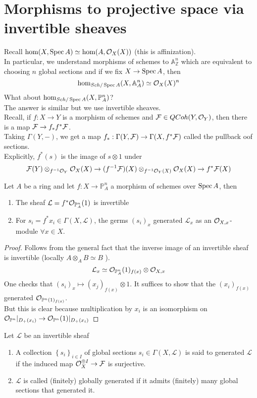 \documentclass[../main.tex]{subfiles}
\begin{document}
\section{Morphisms to projective space via invertible sheaves}
Recall $\hom( X,\operatorname{Spec} A) \simeq \hom( A,\mathcal{O}_X( X) ) $ (this is affinization).\\
In particular, we understand morphisms of schemes to  $\mathbb{A}^{n}_{ \mathbb{Z}} $ which are equivalent to choosing $n$  global sections and if we fix $X\to \operatorname{Spec} A$, then
\[ 
\hom_{Sch /\operatorname{Spec} A} ( X, \mathbb{A}^{n}_{A} ) \simeq \mathcal{O}_X( X)^{n}
\]
What about $\hom_{Sch /\operatorname{Spec} A} ( X, \mathbb{P}^{n}_A) $?\\
The answer is similar but we use invertible sheaves.\\
Recall, if $f:X\to Y$ is a morphism of schemes and $\mathcal{F}\in QCoh( Y,\mathcal{O}_Y) $, then there is a map $\mathcal{F}\to f_\ast f^{\ast}\mathcal{F}$.\\
Taking $\Gamma( Y,-) $, we get a map $f_\ast: \Gamma( Y,\mathcal{F}) \to \Gamma( X,f^{\ast}\mathcal{F}) $ called the pullback oof sections.\\
Explicitly, $f^{\ast}( s) $ is the image of $s\otimes 1$ under
\[ 
\mathcal{F}( Y) \otimes_{f^{-1}\mathcal{O}_Y} \mathcal{O}_X( X) \to ( f^{-1}\mathcal{F}) ( X) \otimes_{f^{-1}\mathcal{O}_Y( X) } \mathcal{O}_X( X) \to f^{\ast }\mathcal{F}( X) 
\]
\begin{propo}
Let $A$ be a ring and let $f:X\to \mathbb{P}^{n}_A$ a morphism of schemes over $\operatorname{Spec} A$, then
\begin{enumerate}
\item The sheaf $ \mathcal{L}= f^{\ast}\mathcal{O}_{\mathbb{P}^{n}_A} ( 1) $ is invertible
\item For $s_i = f^{\ast }x_i\in \Gamma( X, \mathcal{L}) $, the germs $( s_i)_x$ generated $ \mathcal{L}_x$ as an $\mathcal{O}_{X,x} $-module $\forall x\in X$.
\end{enumerate}
\end{propo}
\begin{proof}
Follows from the general fact that the inverse image of an invertible sheaf is invertible (locally $A\otimes_A B\simeq B$ ).\\
\[ 
\mathcal{L}_x\simeq \mathcal{O}_{ \mathbb{P}^{n}_A} ( 1)_{f( x) } \otimes \mathcal{O}_{X,x} 	
\]
One checks that $( s_i)_x \mapsto ( x_j)_{f( x)} \otimes 1$.
It suffices to show that the $( x_i)_{f( x) }$ generated $\mathcal{O}_{ \mathbb{P}^{n}( 1) _{f( x) }} $.\\
But this is clear because multiplication by $x_i$ is an isomorphism on $\mathcal{O}_{ \mathbb{P}^{n}}|_{D_+( x_i) }  \to \mathcal{O}_{ \mathbb{P}^{n}} ( 1)|_{D_+( x_i) }  $ 
\end{proof}
\begin{defn}
	Let $\mathcal{L}$ be an invertible sheaf
	\begin{enumerate}
	\item A collection $ \left\{ s_i \right\}_{ i \in I} $ of global sections $s_i \in \Gamma( X, \mathcal{L}) $ is said to generated $ \mathcal{L}$ if the induced map $\mathcal{O}_{X}^{\oplus I}\to \mathcal{F}$ is surjective.
	\item $ \mathcal{L}$ is called (finitely) globally generated if it admits (finitely) many global sections that generated it.
	\end{enumerate}
	
\end{defn}
\end{document}
